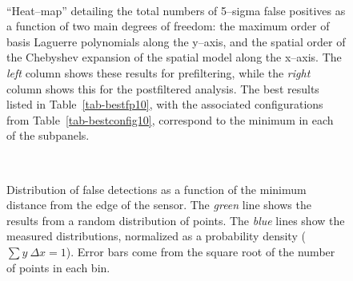 \documentclass[prd, nofootinbib, floatfix, 11pt,tightenlines,times]{article}
\begin{document}
\begin{figure}
 \\
\caption{``Heat--map'' detailing the total numbers of 5--sigma false
  positives as a function of two main degrees of freedom: the maximum
  order of basis Laguerre polynomials along the y--axis, and the
  spatial order of the Chebyshev expansion of the spatial model along
  the x--axis.  The {\it left} column shows these results for
  prefiltering, while the {\it right} column shows this for the
  postfiltered analysis.  The best results listed in
  Table~\ref{tab-bestfp10}, with the associated configurations from
  Table~\ref{tab-bestconfig10}, correspond to the minimum in each of the
  subpanels.  }
\label{fp_heatmap}
\end{figure}


\begin{figure}
 \\
\caption{Distribution of false detections as a function of the minimum
  distance from the edge of the sensor.  The {\it green} line shows
  the results from a random distribution of points.  The {\it blue}
  lines show the measured distributions, normalized as a probability
  density ($\sum y~\Delta x = 1$).  Error bars come from the square
  root of the number of points in each bin. }
\label{edgedist}
\end{figure}
\end{document}
